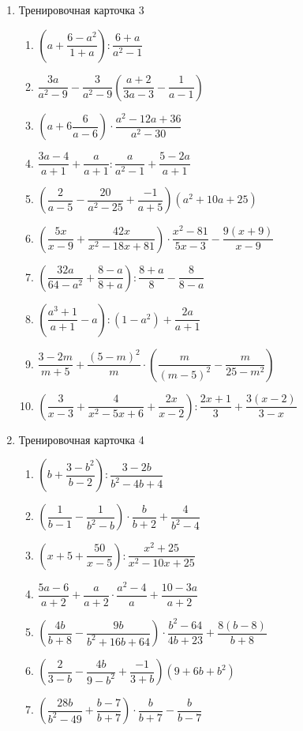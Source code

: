 \documentclass[12pt, a4paper]{article}
\begin{document}
\begin{enumerate}
\begin{enumerate}[label=\asbuk*)]
 			\end{enumerate}
 			\item Тренировочная карточка 3
 		\begin{enumerate}[label=\asbuk*)]
 			\item \(\left( a+\dfrac{6-a^2}{1+a} \right):\dfrac{6+a}{a^2-1}\)
 			\item \(\dfrac{3a}{a^2-9}-\dfrac{3}{a^2-9}\left( \dfrac{a+2}{3a-3}-\dfrac{1}{a-1} \right)\)
 			\item \(\left( a+6\dfrac{6}{a-6} \right)\cdot\dfrac{a^2-12a+36}{a^2-30}\)
 			\item \(\dfrac{3a-4}{a+1}+\dfrac{a}{a+1}:\dfrac{a}{a^2-1}+\dfrac{5-2a}{a+1}\)
 			\item \(\left( \dfrac{2}{a-5}-\dfrac{20}{a^2-25}+\dfrac{-1}{a+5} \right)(a^2+10a+25)\)
 			\item \(\left( \dfrac{5x}{x-9}+\dfrac{42x}{x^2-18x+81} \right)\cdot\dfrac{x^2-81}{5x-3}-\dfrac{9(x+9)}{x-9}\)
 			\item \(\left(  \dfrac{32a}{64-a^2}+\dfrac{8-a}{8+a}\right):\dfrac{8+a}{8}-\dfrac{8}{8-a}\)
 			\item \(\left( \dfrac{a^3+1}{a+1}-a \right):(1-a^2)+\dfrac{2a}{a+1}\)
 			\item \(\dfrac{3-2m}{m+5}+\dfrac{(5-m)^2}{m}\cdot\left( \dfrac{m}{(m-5)^2}-\dfrac{m}{25-m^2} \right)\)
 			\item \(\left( \dfrac{3}{x-3}+\dfrac{4}{x^2-5x+6}+\dfrac{2x}{x-2} \right):\dfrac{2x+1}{3}+\dfrac{3(x-2)}{3-x}\)
 		\end{enumerate}
 	\item Тренировочная карточка 4
 	\begin{enumerate}[label=\asbuk*)]
 		\item \(\left( b+\dfrac{3-b^2}{b-2} \right):\dfrac{3-2b}{b^2-4b+4}\)
 		\item \(\left( \dfrac{1}{b-1}-\dfrac{1}{b^2-b} \right)\cdot\dfrac{b}{b+2}+\dfrac{4}{b^2-4}\)
 		\item \(\left( x+5+\dfrac{50}{x-5} \right):\dfrac{x^2+25}{x^2-10x+25}\)	
 		\item \(\dfrac{5a-6}{a+2}+\dfrac{a}{a+2}\cdot\dfrac{a^2-4}{a}+\dfrac{10-3a}{a+2}\)
 		\item \(\left( \dfrac{4b}{b+8}-\dfrac{9b}{b^2+16b+64} \right)\cdot\dfrac{b^2-64}{4b+23}+\dfrac{8(b-8)}{b+8}\)
 		\item \(\left( \dfrac{2}{3-b}-\dfrac{4b}{9-b^2}+\dfrac{-1}{3+b} \right)(9+6b+b^2)\)
 		\item \(\left( \dfrac{28b}{b^2-49}+\dfrac{b-7}{b+7} \right)\cdot\dfrac{b}{b+7}-\dfrac{b}{b-7}\)

\end{enumerate}
\end{enumerate}
\end{document}
